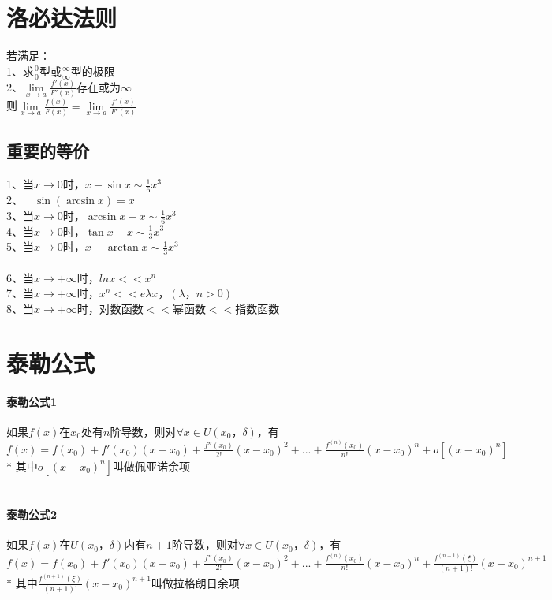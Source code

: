 \documentclass{article}
\begin{document}
\begin{flushleft}
	\section{洛必达法则}
	
	若满足：\\
	1、求$\frac{0}{0}$型或$\frac{\infty}{\infty}$型的极限\\
	2、$\lim\limits_{x\to a}\frac{f'(x)}{F'(x)}$存在或为$\infty$\\
	则$\lim\limits_{x\to a}\frac{f(x)}{F(x)}=\lim\limits_{x\to a}\frac{f'(x)}{F'(x)}$\\
	
	\subsection{重要的等价}
	
	1、当$x\to 0$时，$x-\sin x \sim \frac{1}{6}x^3$\\
	2、\ \ $\sin(\arcsin x)=x$\\
	3、当$x\to 0$时，$\arcsin x-x \sim \frac{1}{6}x^3$\\
	4、当$x\to 0$时，$\tan x-x \sim \frac{1}{3}x^3$\\
	5、当$x\to 0$时，$x-\arctan x \sim \frac{1}{3}x^3$\\
	~\\
	6、当$x\to +\infty$时，$lnx << x^n$\\
	7、当$x\to +\infty$时，$x^n << e{\lambda x}，(\lambda，n>0)$\\
	8、当$x\to +\infty$时，对数函数$<<$幂函数$<<$指数函数\\
	
	\section{泰勒公式}
	
	\paragraph{泰勒公式1}
	如果$f(x)$在$x_0$处有$n$阶导数，则对$\forall x \in U(x_0，\delta)$，有$f(x)=f(x_0)+f'(x_0)(x-x_0)+\frac{f''(x_0)}{2!}(x-x_0)^2+...+\frac{f^{(n)}(x_0)}{n!}(x-x_0)^n+o[(x-x_0)^n]$\\
	* 其中$o[(x-x_0)^n]$叫做佩亚诺余项\\
	~\\
	\paragraph{泰勒公式2}
	如果$f(x)$在$U(x_0，\delta)$内有$n+1$阶导数，则对$\forall x \in U(x_0，\delta)$，有$f(x)=f(x_0)+f'(x_0)(x-x_0)+\frac{f''(x_0)}{2!}(x-x_0)^2+...+\frac{f^{(n)}(x_0)}{n!}(x-x_0)^n+\frac{f^{(n+1)}(\xi)}{(n+1)!}(x-x_0)^{n+1}$\\
	* 其中$\frac{f^{(n+1)}(\xi)}{(n+1)!}(x-x_0)^{n+1}$叫做拉格朗日余项\\


\end{flushleft}
\end{document}

